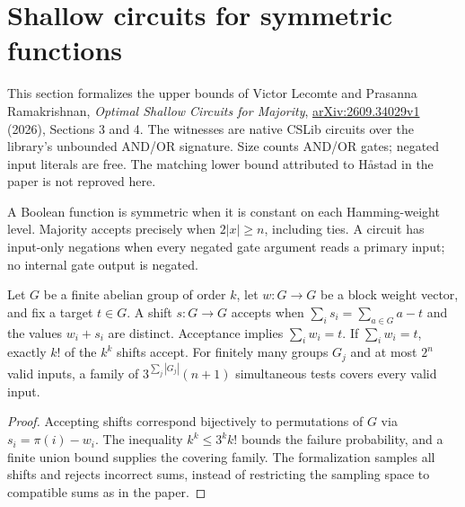 \section{Shallow circuits for symmetric functions}
\label{sec:circuits-shallow-symmetric}

This section formalizes the upper bounds of Victor Lecomte and Prasanna
Ramakrishnan, \emph{Optimal Shallow Circuits for Majority},
\href{https://arxiv.org/abs/2609.34029}{arXiv:2609.34029v1} (2026),
Sections 3 and 4. The witnesses are native CSLib circuits over the library's
unbounded AND/OR signature. Size counts AND/OR gates; negated input literals
are free. The matching lower bound attributed to H\aa stad in the paper is
not reproved here.

\begin{definition}
  \label{def:circuits-shallow-symmetric}
  \leanok
  A Boolean function is symmetric when it is constant on each Hamming-weight
  level. Majority accepts precisely when $2|x| \ge n$, including ties.
  A circuit has input-only negations when every negated gate argument reads
  a primary input; no internal gate output is negated.
\end{definition}

\begin{lemma}
  \label{lem:circuits-shallow-shifts}
  \leanok
  Let $G$ be a finite abelian group of order $k$, let $w:G\to G$ be a block
  weight vector, and fix a target $t\in G$. A shift $s:G\to G$ accepts when
  $\sum_i s_i=\sum_{a\in G}a-t$ and the values $w_i+s_i$ are distinct.
  Acceptance implies $\sum_i w_i=t$. If $\sum_i w_i=t$, exactly $k!$ of the
  $k^k$ shifts accept. For finitely many groups $G_j$ and at most $2^n$ valid
  inputs, a family of $3^{\sum_j |G_j|}(n+1)$ simultaneous tests covers every
  valid input.
\end{lemma}
\begin{proof}
  \leanok
  Accepting shifts correspond bijectively to permutations of $G$ via
  $s_i=\pi(i)-w_i$. The inequality $k^k\le 3^k k!$ bounds the failure
  probability, and a finite union bound supplies the covering family.
  The formalization samples all shifts and rejects incorrect sums, instead
  of restricting the sampling space to compatible sums as in the paper.
\end{proof}


